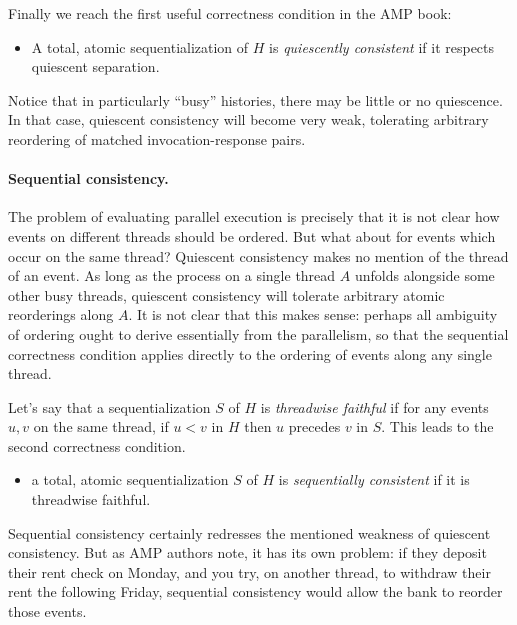 \documentclass[
]{article}
\begin{document}
Finally we reach the first useful correctness condition in the AMP book:
\begin{itemize}
\item[] A total, atomic sequentialization of $H$ is \emph{quiescently consistent} if it respects quiescent separation.
\end{itemize}

Notice that in particularly ``busy'' histories, there may be little or no quiescence.  In that case, quiescent consistency will become very weak, tolerating arbitrary reordering of matched invocation-response pairs.  


\paragraph{Sequential consistency.} 
The problem of evaluating parallel execution is precisely that it is not clear how events on different threads should be ordered.  But what about for events which occur on the same thread?  Quiescent consistency makes no mention of the thread of an event.  As long as the process on a single thread $A$ unfolds alongside some other busy threads, quiescent consistency will tolerate arbitrary atomic reorderings along $A$.  It is not clear that this makes sense: perhaps all ambiguity of ordering ought to derive essentially from the parallelism, so that the sequential correctness condition applies directly to the ordering of events along any single thread. 

Let's say that a sequentialization $S$ of $H$ is \emph{threadwise faithful} if 
for any events $u,v$ on the same thread, if $u<v$ in $H$ then $u$ precedes $v$ in $S$. This leads to the second correctness condition.  
\begin{itemize}
\item[] a total, atomic sequentialization $S$ of $H$ is \emph{sequentially consistent} if it is threadwise faithful.
\end{itemize}
Sequential consistency certainly redresses the mentioned weakness of quiescent consistency.  But as AMP authors note, it has its own problem: if they deposit their rent check on Monday, and you try, on another thread, to withdraw their rent the following Friday, sequential consistency would allow the bank to reorder those events.
\end{document}
